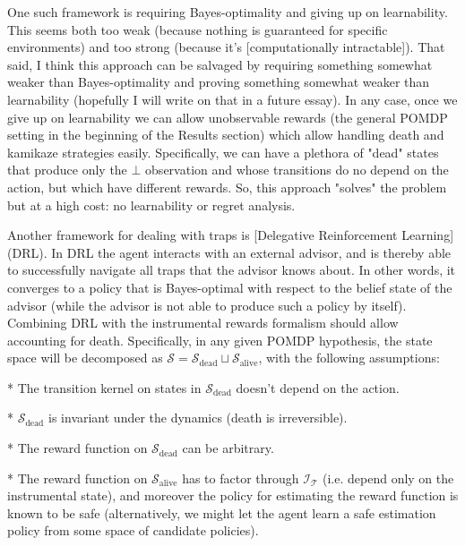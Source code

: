 \documentclass[a4paper]{article}
\newcommand{\San}[1]{}
\newcommand{\St}{\mathcal{S}}
\newcommand{\T}{\mathcal{T}}
\newcommand{\In}{\mathcal{I}}
\begin{document}
One such framework is requiring Bayes-optimality and giving up on learnability. This seems both too weak (because nothing is guaranteed for specific environments) and too strong (because it's [computationally intractable]\San{(https://cstheory.stackexchange.com/questions/41396/is-bayes-optimal-rl-of-a-finite-set-of-dfas-feasible)}). That said, I think this approach can be salvaged by requiring something somewhat weaker than Bayes-optimality and proving something somewhat weaker than learnability (hopefully I will write on that in a future essay). In any case, once we give up on learnability we can allow unobservable rewards (the general POMDP setting in the beginning of the Results section) which allow handling death and kamikaze strategies easily. Specifically, we can have a plethora of "dead" states that produce only the $\bot$ observation and whose transitions do no depend on the action, but which have different rewards. So, this approach "solves" the problem but at a high cost: no learnability or regret analysis.

Another framework for dealing with traps is [Delegative Reinforcement Learning]\San{(https://www.lesswrong.com/posts/5bd75cc58225bf06703754d5/delegative-reinforcement-learning-with-a-merely-sane-advisor)} (DRL). In DRL the agent interacts with an external advisor, and is thereby able to successfully navigate all traps that the advisor knows about. In other words, it converges to a policy that is Bayes-optimal with respect to the belief state of the advisor (while the advisor is not able to produce such a policy by itself). Combining DRL with the instrumental rewards formalism should allow accounting for death. Specifically, in any given POMDP hypothesis, the state space will be decomposed as $\St=\St_{\text{dead}}\sqcup\St_{\text{alive}}$, with the following assumptions:

* The transition kernel on states in $\St_{\text{dead}}$ doesn't depend on the action.

* $\St_{\text{dead}}$ is invariant under the dynamics (death is irreversible).

* The reward function on $\St_{\text{dead}}$ can be arbitrary.

* The reward function on $\St_{\text{alive}}$ has to factor through $\In_\T$ (i.e. depend only on the instrumental state), and moreover the policy for estimating the reward function is known to be safe (alternatively, we might let the agent learn a safe estimation policy from some space of candidate policies).
\end{document}
